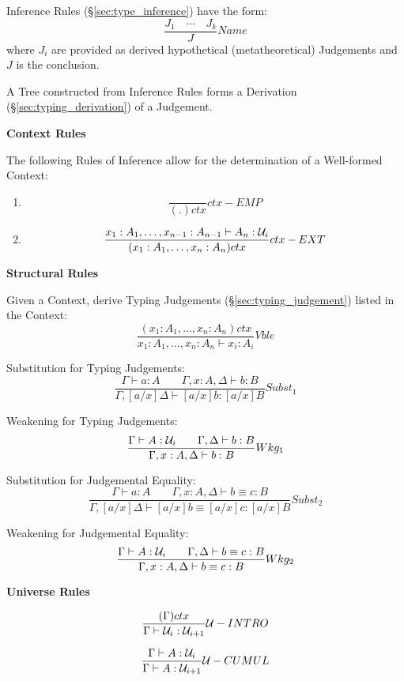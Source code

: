 Inference Rules (\S\ref{sec:type_inference}) have the form:
\[
  \frac{J_1 \quad \cdots \quad J_k} {J} Name
\]
where $J_i$ are provided as derived hypothetical (metatheoretical)
Judgements and $J$ is the conclusion.

A Tree constructed from Inference Rules forms a Derivation
(\S\ref{sec:typing_derivation}) of a Judgement.



\textbf{Context Rules}

The following Rules of Inference allow for the determination of a
Well-formed Context:
\begin{enumerate}
\item
\[
  {
    \frac{}{(.)ctx}
  } ctx-EMP
\]
\item
\[
  {
    \frac
    {x_1:A_1, \ldots, x_{n-1}:A_{n-1} \vdash A_n : \mathcal{U}_i}
    {(x_1:A_1,\ldots,x_n:A_n) ctx}
  } ctx-EXT
\]
\end{enumerate}



\textbf{Structural Rules}

Given a Context, derive Typing Judgements
(\S\ref{sec:typing_judgement}) listed in the Context:
\[
  {
    \frac
    {(x_1:A_1, \ldots, x_n:A_n)ctx}
    {x_1:A_1, \ldots, x_n:A_n \vdash x_i:A_i}
  } Vble
\]

Substitution for Typing Judgements:
\[
  {
    \frac
    {\Gamma \vdash a : A \;\;\;\;\;\;\;
    \Gamma,x:A,\Delta \vdash b : B}
    {\Gamma,[a/x]\Delta \vdash [a/x]b : [a/x]B}
  } Subst_1
\]

Weakening for Typing Judgements:
\[
  {
    \frac
    {\Gamma \vdash A : \mathcal{U}_i \;\;\;\;\;\;\;
    \Gamma,\Delta \vdash b : B}
    {\Gamma,x:A,\Delta \vdash b:B}
  } Wkg_1
\]

Substitution for Judgemental Equality:
\[
  {
    \frac
    {\Gamma \vdash a : A \;\;\;\;\;\;\;
    \Gamma,x:A,\Delta \vdash b \equiv c : B}
    {\Gamma,[a/x]\Delta \vdash [a/x]b \equiv [a/x]c : [a/x]B}
  } Subst_2
\]

Weakening for Judgemental Equality:
\[
  {
    \frac
    {\Gamma \vdash A : \mathcal{U}_i \;\;\;\;\;\;\;
    \Gamma,\Delta \vdash b \equiv c : B}
    {\Gamma, x:A, \Delta \vdash b \equiv c : B}
  } Wkg_2
\]



\textbf{Universe Rules}

\[
  {
    \frac
    {(\Gamma) ctx}
    {\Gamma \vdash \mathcal{U}_i : \mathcal{U}_{i+1}}
  } \mathcal{U}-INTRO
\]

\[
  {
    \frac
    {\Gamma \vdash A : \mathcal{U}_i}
    {\Gamma \vdash A : \mathcal{U}_{i+1}}
  } \mathcal{U}-CUMUL
\]



